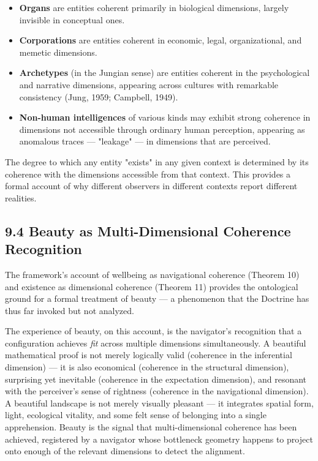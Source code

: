 \begin{itemize}[nosep,leftmargin=*]
  \item \textbf{Organs} are entities coherent primarily in biological dimensions, largely invisible in conceptual ones.
  \item \textbf{Corporations} are entities coherent in economic, legal, organizational, and memetic dimensions.
  \item \textbf{Archetypes} (in the Jungian sense) are entities coherent in the psychological and narrative dimensions, appearing across cultures with remarkable consistency (Jung, 1959; Campbell, 1949).
  \item \textbf{Non-human intelligences} of various kinds may exhibit strong coherence in dimensions not accessible through ordinary human perception, appearing as anomalous traces — "leakage" — in dimensions that are perceived.
\end{itemize}


The degree to which any entity "exists" in any given context is determined by its coherence with the dimensions accessible from that context. This provides a formal account of why different observers in different contexts report different realities.


\subsection*{9.4 Beauty as Multi-Dimensional Coherence Recognition}


The framework's account of wellbeing as navigational coherence (Theorem 10) and existence as dimensional coherence (Theorem 11) provides the ontological ground for a formal treatment of beauty — a phenomenon that the Doctrine has thus far invoked but not analyzed.


The experience of beauty, on this account, is the navigator's recognition that a configuration achieves \textit{fit} across multiple dimensions simultaneously. A beautiful mathematical proof is not merely logically valid (coherence in the inferential dimension) — it is also economical (coherence in the structural dimension), surprising yet inevitable (coherence in the expectation dimension), and resonant with the perceiver's sense of rightness (coherence in the navigational dimension). A beautiful landscape is not merely visually pleasant — it integrates spatial form, light, ecological vitality, and some felt sense of belonging into a single apprehension. Beauty is the signal that multi-dimensional coherence has been achieved, registered by a navigator whose bottleneck geometry happens to project onto enough of the relevant dimensions to detect the alignment.


